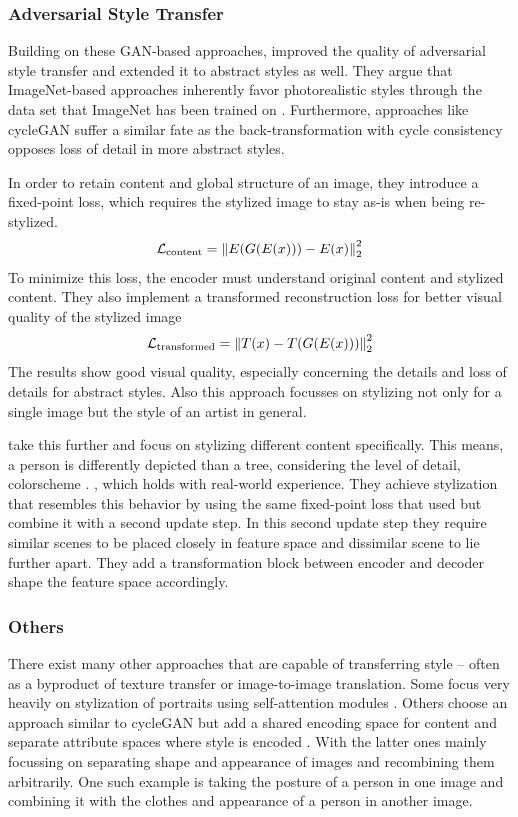 \subsubsection{Adversarial Style Transfer}
Building on these GAN-based approaches, \citeauthor*{artsiom} improved the quality of adversarial style transfer and extended it to abstract styles as well.
They argue that ImageNet-based approaches inherently favor photorealistic styles through the data set that ImageNet has been trained on \cite{artsiom}.
Furthermore, approaches like cycleGAN suffer a similar fate as the back-transformation with cycle consistency opposes loss of detail in more abstract styles.

In order to retain content and global structure of an image, they introduce a fixed-point loss, which requires the stylized image to stay as-is when being re-stylized.
\begin{align}
    \mathcal{L}_{\text{content}} = \left\lVert E(G(E(x))) - E(x)\right\rVert^2_2
\end{align}
To minimize this loss, the encoder must understand original content and stylized content.
They also implement a transformed reconstruction loss for better visual quality of the stylized image
\begin{align}
    \mathcal{L}_{\text{transformed}} = \left\lVert T(x) - T(G(E(x)))\right\rVert^2_2
\end{align}
The results show good visual quality, especially concerning the details and loss of details for abstract styles.
Also this approach focusses on stylizing not only for a single image but the style of an artist in general.

\citeauthor*{dima} take this further and focus on stylizing different content specifically.
This means, a person is differently depicted than a tree, considering the level of detail, colorscheme \etc. , which holds with real-world experience.
They achieve stylization that resembles this behavior by using the same fixed-point loss that \citeauthor*{artsiom} used but combine it with a second update step.
In this second update step they require similar scenes to be placed closely in feature space and dissimilar scene to lie further apart.
They add a transformation block between encoder and decoder shape the feature space accordingly.

\subsubsection{Others}
There exist many other approaches that are capable of transferring style -- often as a byproduct of texture transfer or image-to-image translation.
Some focus very heavily on stylization of portraits using self-attention modules \cite{ugatit}.
Others choose an approach similar to cycleGAN but add a shared encoding space for content and separate attribute spaces where style is encoded \cite{munit, drit, drit++}.
With the latter ones mainly focussing on separating shape and appearance of images and recombining them arbitrarily.
One such example is taking the posture of a person in one image and combining it with the clothes and appearance of a person in another image.


